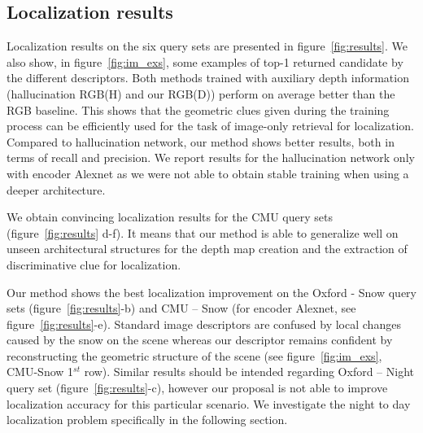

\subsection{Localization results}
\label{subsec:results}

Localization results on the six query sets are presented in figure~\ref{fig:results}. We also show, in figure~\ref{fig:im_exs}, some examples of top-1 returned candidate by the different descriptors. Both methods trained with auxiliary depth information (hallucination RGB(H) and our RGB(D)) perform on average better than the RGB baseline. This shows that the geometric clues given during the training process can be efficiently used for the task of image-only retrieval for localization. Compared to hallucination network, our method shows better results, both in terms of recall and precision. We report results for the hallucination network only with encoder Alexnet as we were not able to obtain stable training when using a deeper architecture.

We obtain convincing localization results for the CMU query sets (figure~\ref{fig:results} d-f). It means that our method is able to generalize well on unseen architectural structures for the depth map creation and the extraction of discriminative clue for localization.

Our method shows the best localization improvement on the Oxford - Snow query sets (figure~\ref{fig:results}-b) and CMU -- Snow (for encoder Alexnet, see figure~\ref{fig:results}-e). Standard image descriptors are confused by local changes caused by the snow on the scene whereas our descriptor remains confident by reconstructing the geometric structure of the scene (see figure~\ref{fig:im_exs}, CMU-Snow 1$^{st}$ row). Similar results should be intended regarding Oxford -- Night query set (figure~\ref{fig:results}-c), however our proposal is not able to improve localization accuracy for this particular scenario. We investigate the night to day localization problem specifically in the following section.

